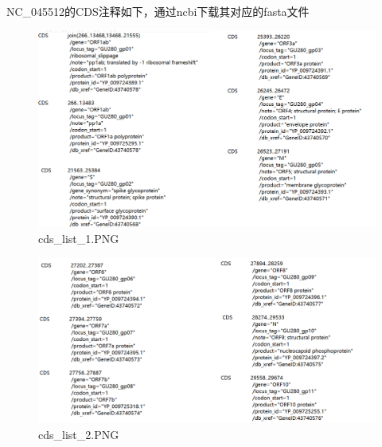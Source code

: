 \documentclass[supercite]{HustGraduPaper}
\begin{document}
	  \paragraph{}\label{subpara:subpara}NC\_045512的CDS注释如下，通过ncbi下载其对应的fasta文件
		\begin{figure}[H]
			\centering
			\includegraphics[width=1\textwidth]{./material/practice2/cds_all_1.png}
			\caption{cds\_list\_1.PNG}
		\end{figure}
		\begin{figure}[H]
			\centering
			\includegraphics[width=1\textwidth]{./material/practice2/cds_all_2.png}
			\caption{cds\_list\_2.PNG}
		\end{figure}
\end{document}
